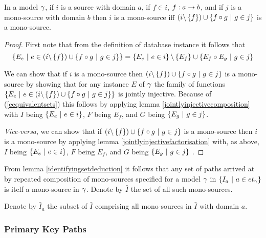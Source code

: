 \begin{lemma}
\label{identifyingsetdeduction}

In a model $\gamma$, if $i$ is a source with domain $a$,
if $f \in i$, $f: a \rightarrow b$, and if $j$ is a mono-source with domain $b$ then 
$i$ is a mono-source iff $(i \backslash \left\{f\right\}) \cup \left\{f \circ g \ \middle|\ g \in j\right\}$ is a mono-source.
\end{lemma}
\begin{proof}
First note that from the definition of database instance it follows that 
\begin{equation}
\label{eequivalentsets}
\left\{E_e \ \middle|\ e \in (i \backslash \left\{f\right\}) \cup \left\{f \circ g \ \middle|\ g \in j\right\}\right\}
= \left\{E_e \ \middle|\ e \in i\right\} \backslash \left\{E_f\right\} \cup \left\{E_f \circ E_g \ \middle|\ g \in j\right\}
\end{equation}

We can show that if $i$ is a mono-source 
then $(i \backslash \left\{f\right\}) \cup \left\{f \circ g \ \middle|\ g \in j\right\}$ is a mono-source
by showing that for any instance $E$ of $\gamma$ the family of functions 
$\left\{E_e \ \middle|\ e \in (i \backslash \left\{f\right\}) \cup \left\{f \circ g \ \middle|\ g \in j\right\}\right\}$
is jointly injective. Because of (\ref{eequivalentsets}) this follows by applying lemma \ref{jointlyinjectivecomposition} with $I$ being $\left\{E_e \ \middle|\ e \in i\right\}$,
$F$ being $E_f$,  and $G$ being $\left\{E_g \ \middle|\ g \in j\right\}$.

\textit{Vice-versa}, we can show that if $(i \backslash \left\{f\right\}) \cup \left\{f \circ g \ \middle|\ g \in j\right\}$ is a mono-source then $i$ is a mono-source by applying lemma \ref{jointlyinjectivefactorisation} 
with, as above, $I$ being $\left\{E_e \ \middle|\ e \in i\right\}$,
$F$ being $E_f$,  and $G$ being $\left\{E_g \ \middle|\ g \in j\right\}$ .
\end{proof}

From lemma \ref{identifyingsetdeduction} it follows that any set of paths arrived at by repeated composition of mono-sources specified for a model $\gamma$ in $\left\{I_a \ \middle|\ a \in et_{\gamma}\right\}$ is itelf a mono-source in $\gamma$. Denote by $\bar{I}$ the set  of all such mono-sources.

Denote by $\bar{I}_a$ the subset of $\bar{I}$ comprising all mono-sources in $\bar{I}$ with domain $a$.

\subsubsection{Primary Key Paths }

